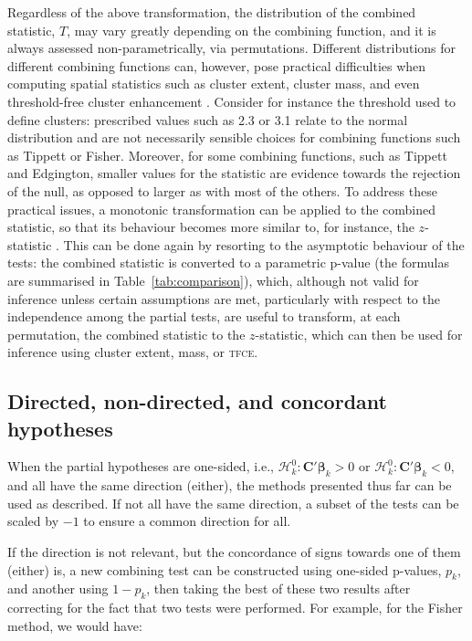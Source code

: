 Regardless of the above transformation, the distribution of the combined statistic, $T$, may vary greatly depending on the combining function, and it is always assessed non-parametrically, via permutations. Different distributions for different combining functions can, however, pose practical difficulties when computing spatial statistics such as cluster extent, cluster mass, and even threshold-free cluster enhancement \citep[\textsc{tfce},][]{Smith2009}. Consider for instance the threshold used to define clusters: prescribed values such as 2.3 or 3.1 \citep{Woo2014} relate to the normal distribution and are not necessarily sensible choices for combining functions such as Tippett or Fisher. Moreover, for some combining functions, such as Tippett and Edgington, smaller values for the statistic are evidence towards the rejection of the null, as opposed to larger as with most of the others. To address these practical issues, a monotonic transformation can be applied to the combined statistic, so that its behaviour becomes more similar to, for instance, the $z$-statistic \citep{Efron2004}. This can be done again by resorting to the asymptotic behaviour of the tests: the combined statistic is converted to a parametric p-value (the formulas are summarised in Table~\ref{tab:comparison}), which, although not valid for inference unless certain assumptions are met, particularly with respect to the independence among the partial tests, are useful to transform, at each permutation, the combined statistic to the $z$-statistic, which can then be used for inference using cluster extent, mass, or \textsc{tfce}.

\subsection{Directed, non-directed, and concordant hypotheses}
\label{sec:comb:directed}

When the partial hypotheses are one-sided, i.e., $\mathcal{H}^{0}_{k} : \mathbf{C}'\boldsymbol{\beta}_{k} > 0$ or $\mathcal{H}^{0}_{k} : \mathbf{C}'\boldsymbol{\beta}_{k} < 0$, and all have the same direction (either), the methods presented thus far can be used as described. If not all have the same direction, a subset of the tests can be scaled by $-1$ to ensure a common direction for all.

If the direction is not relevant, but the concordance of signs towards one of them (either) is, a new combining test can be constructed using one-sided p-values, $p_k$, and another using $1-p_k$, then taking the best of these two results after correcting for the fact that two tests were performed. For example, for the Fisher method, we would have:

